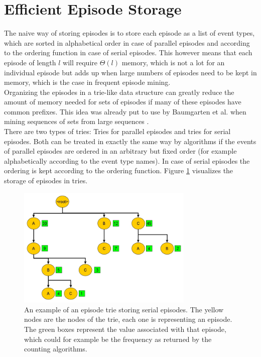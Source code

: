 \section{Efficient Episode Storage}
\label{sec_episodeTrie}
The naive way of storing episodes is to store each episode as a list of event types, which are sorted in alphabetical order in case of parallel episodes and according to the ordering function in case of serial episodes. This however means that each episode of length $l$ will require $\Theta(l)$ memory, which is not a lot for an individual episode but adds up when large numbers of episodes need to be kept in memory, which is the case in frequent episode mining. \\
Organizing the episodes in a trie-like data structure can greatly reduce the amount of memory needed for sets of episodes if many of these episodes have common prefixes. This idea was already put to use by Baumgarten et al. when mining sequences of sets from large sequences \cite{baumgarten2003tree}. \\
There are two types of tries: Tries for parallel episodes and tries for serial episodes. Both can be treated in exactly the same way by algorithms if the events of parallel episodes are ordered in an arbitrary but fixed order (for example alphabetically according to the event type names). In case of serial episodes the ordering is kept according to the ordering function. Figure \ref{fig_trieExample} visualizes the storage of episodes in tries. 
\begin{figure}[h]
	\centering
  	\includegraphics[width=0.75\textwidth]{trieExample}
	\caption[Episode Trie for Serial Episodes]{An example of an episode trie storing serial episodes. The yellow nodes are the nodes of the trie, each one is representing an episode. The green boxes represent the value associated with that episode, which could for example be the frequency as returned by the counting algorithms.}
	\label{fig_trieExample}
\end{figure}

